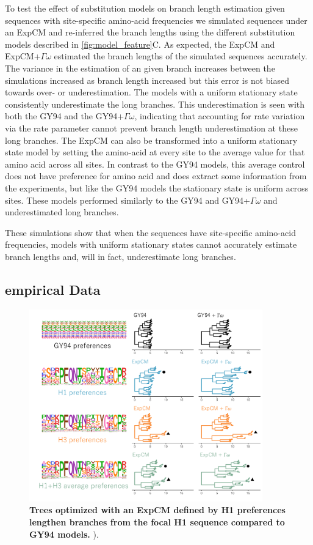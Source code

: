 \documentclass[11pt]{article}
\begin{document}
To test the effect of substitution models on branch length estimation given sequences with site-specific amino-acid frequencies we simulated sequences under an ExpCM and re-inferred the branch lengths using the different substitution models described in \ref{fig:model_feature}C.
As expected, the ExpCM and ExpCM+$\Gamma\omega$ estimated the branch lengths of the simulated sequences accurately. 
The variance in the estimation of an given branch increases between the simulations increased as branch length increased but this error is not biased towards over- or underestimation.
The models with a uniform stationary state consistently underestimate the long branches. 
This underestimation is seen with both the GY94 and the GY94+$\Gamma\omega$, indicating that accounting for rate variation via the rate parameter cannot prevent branch length underestimation at these long branches. 
The ExpCM can also be transformed into a uniform stationary state model by setting the amino-acid at every site to the average value for that amino acid across all sites. 
In contrast to the GY94 models, this average control does not have preference for amino acid and does extract some information from the experiments, but like the GY94 models the stationary state is uniform across sites. 
These models performed similarly to the GY94 and GY94+$\Gamma\omega$ and underestimated long branches. 

These simulations show that when the sequences have site-specific amino-acid frequencies, models with uniform stationary states cannot accurately estimate branch lengths and, will in fact, underestimate long branches. 	

\subsection*{empirical Data}

\begin{figure}[H]
\centerline{\includegraphics[width=0.9\textwidth]{figures/empirical_trees.pdf}}
\caption{\label{fig:empirical_trees}
\textbf{Trees optimized with an ExpCM defined by H1 preferences lengthen branches from the focal H1 sequence compared to GY94 models.} ).
}
\end{figure}
\end{document}
